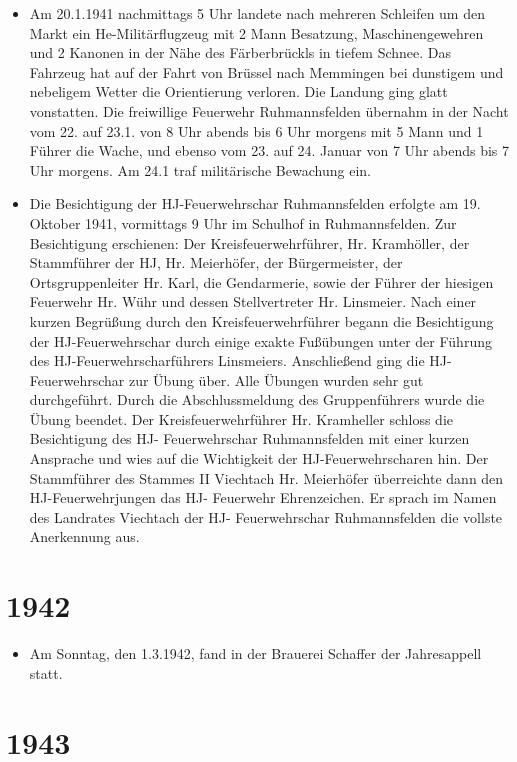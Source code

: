 \documentclass[12pt,a4paper]{book}
\begin{document}
\begin{itemize}
\item Am 20.1.1941 nachmittags 5 Uhr landete nach mehreren Schleifen um
den Markt ein He-Militärflugzeug mit 2 Mann Besatzung, Maschinengewehren
und 2 Kanonen in der Nähe des Färberbrückls in tiefem Schnee. Das
Fahrzeug hat auf der Fahrt von Brüssel nach Memmingen bei dunstigem und
nebeligem Wetter die Orientierung verloren. Die Landung ging glatt
vonstatten. Die freiwillige Feuerwehr Ruhmannsfelden übernahm in der
Nacht vom 22. auf 23.1. von 8 Uhr abends bis 6 Uhr morgens mit 5 Mann
und 1 Führer die Wache, und ebenso vom 23. auf 24. Januar von 7 Uhr
abends bis 7 Uhr morgens. Am 24.1 traf militärische Bewachung ein.

\item Die Besichtigung der HJ-Feuerwehrschar Ruhmannsfelden erfolgte am
19. Oktober 1941, vormittags 9 Uhr im Schulhof in Ruhmannsfelden. Zur
Besichtigung erschienen: Der Kreisfeuerwehrführer, Hr. Kramhöller, der
Stammführer der HJ, Hr. Meierhöfer, der Bürgermeister, der
Ortsgruppenleiter Hr. Karl, die Gendarmerie, sowie der Führer der
hiesigen Feuerwehr Hr. Wühr und dessen Stellvertreter Hr. Linsmeier.
Nach einer kurzen Begrüßung durch den Kreisfeuerwehrführer begann die
Besichtigung der HJ-Feuerwehrschar durch einige exakte Fußübungen unter
der Führung des HJ-Feuerwehrscharführers Linsmeiers. Anschließend ging
die HJ- Feuerwehrschar zur Übung über. Alle Übungen wurden sehr gut
durchgeführt. Durch die Abschlussmeldung des Gruppenführers wurde die
Übung beendet. Der Kreisfeuerwehrführer Hr. Kramheller schloss die
Besichtigung des HJ- Feuerwehrschar Ruhmannsfelden mit einer kurzen
Ansprache und wies auf die Wichtigkeit der HJ-Feuerwehrscharen hin. Der
Stammführer des Stammes II Viechtach Hr. Meierhöfer überreichte dann den
HJ-Feuerwehrjungen das HJ- Feuerwehr Ehrenzeichen. Er sprach im Namen
des Landrates Viechtach der HJ- Feuerwehrschar Ruhmannsfelden die
vollste Anerkennung aus.
\end{itemize}

\section*{1942}

\begin{itemize}
\item Am Sonntag, den 1.3.1942, fand in der Brauerei Schaffer der
Jahresappell statt.
\end{itemize}

\section*{1943}
\end{document}
